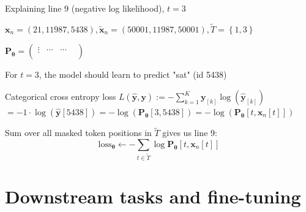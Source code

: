 \documentclass[12pt,aspectratio=169,handout]{beamer}
\begin{document}
\begin{frame}{Explaining line 9 (negative log likelihood), $t = 3$}
	
	\begin{small}
		$\bm{x}_n = (21, 11987, 5438), \bm{\tilde{x}}_n = (50001, 11987, 50001), \tilde{T} = \left\{ 1, 3 \right\}$
		
		$
		\bm{P_{\theta}} =
		\begin{pmatrix}
			\vdots &  \cdots &  \cdots &  \\
		\end{pmatrix}
		$
	\end{small}	
	
	For $t = 3$, the model should learn to predict "sat" (id 5438)
	
	\begin{block}{Categorical cross entropy loss}
		$L (\bm{\hat{y}, \bm{y}}) := - \sum_{k = 1}^{K} \bm{y}_{[k]} \log \left(  \bm{\hat{y}}_{[k]} \right)$ \\
		$= - 1 \cdot \log (\bm{\hat{y}}[5438])
		= - \log(\bm{P_{\theta}}[3, 5438])
		= - \log(\bm{P_{\theta}}[t, \bm{x}_n[t]])$	
	\end{block}
	
	
	Sum over all masked token positions in $\tilde{T}$ gives us line 9:\\
	$$\text{loss}_{\bm{\theta}} \gets - \sum_{t \in \tilde{T}} \log \bm{P_{\theta}} [t, \bm{x}_n[t]] $$
	
\end{frame}







\section{Downstream tasks and fine-tuning}
\end{document}
